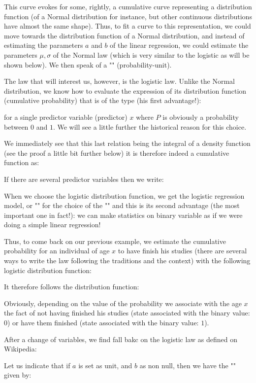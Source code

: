 	This curve evokes for some, rightly, a cumulative curve representing a distribution function (of a Normal distribution for instance, but other continuous distributions have almost the same shape). Thus, to fit a curve to this representation, we could move towards the distribution function of a Normal distribution, and instead of estimating the parameters $a$ and $b$ of the linear regression, we could estimate the parameters $\mu,\sigma$ of the Normal law (which is very similar to the logistic as will be shown below). We then speak of a "" (probability-unit).
	
	The law that will interest us, however, is the logistic law. Unlike the Normal distribution, we know how to evaluate the expression of its distribution function (cumulative probability) that is of the type (his first advantage!):
	
	for a single predictor variable (predictor) $x$ where $P$ is obviously a probability between $0$ and $1$. We will see a little further the historical reason for this choice.
	
	We immediately see that this last relation being the integral of a density function (see the proof a little bit further below) it is therefore indeed a cumulative function as:
	
	If there are several predictor variables then we write:
	
	When we choose the logistic distribution function, we get the logistic regression model, or "" for the choice of the "" and this is its second advantage (the most important one in fact!): we can make statistics on binary variable as if we were doing a simple linear regression!
	
	Thus, to come back on our previous example, we estimate the cumulative probability for an individual of age $x$ to have finish his studies (there are several ways to write the law following the traditions and the context) with the following logistic distribution function:
	
	It therefore follows the distribution function:
	
	Obviously, depending on the value of the probability we associate with the age $x$ the fact of not having finished his studies (state associated with the binary value: $0$) or have them finished (state associated with the binary value: $1$).	
	\begin{tcolorbox}[title=Remark,colframe=black,arc=10pt]
	After a change of variables, we find fall bakc on the logistic law as defined on Wikipedia:
	
	\end{tcolorbox}	
	Let us indicate that if $a$ is set as unit, and $b$ as non null, then we have the "" given by:
	
